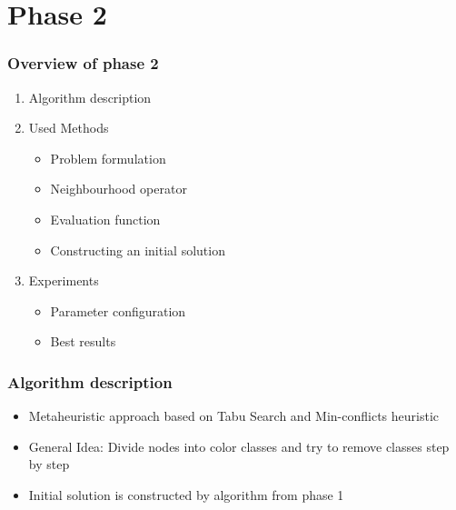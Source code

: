 \documentclass{beamer}
\begin{document}
\section{Phase 2}
  \begin{frame}
    \frametitle{Overview of phase 2}
    \begin{enumerate}

        \item Algorithm description
        \item Used Methods
          \begin{itemize}
            \item Problem formulation
            \item Neighbourhood operator
            \item Evaluation function
            \item Constructing an initial solution
          \end{itemize}
        \item Experiments
          \begin{itemize}
          \item Parameter configuration
          \item Best results
          \end{itemize}


    \end{enumerate}
  \end{frame}


\begin{frame}
    \frametitle{Algorithm description}

    \begin{itemize}
    \item Metaheuristic approach based on Tabu Search and Min-conflicts heuristic
    \item General Idea: Divide nodes into color classes and try to remove classes step by step
    \item Initial solution is constructed by algorithm from phase 1
    \end{itemize}

  \end{frame}
\end{document}
